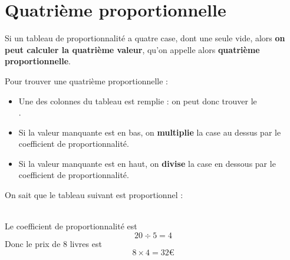 \documentclass[a4paper,11pt]{article}
\begin{document}
\section{Quatrième proportionnelle}

\begin{cours}
	Si un tableau de proportionnalité a quatre case, dont une seule vide, alors \textbf{on peut calculer la quatrième valeur}, qu'on appelle alors \textbf{quatrième proportionnelle}.
\end{cours}

\begin{methode}
	Pour trouver une quatrième proportionnelle :
	\begin{itemize}
		\item Une des colonnes du tableau est remplie : on peut donc trouver le \\ .
		\item Si la valeur manquante est en bas, on \textbf{multiplie} la case au dessus par le coefficient de proportionnalité.
		\item Si la valeur manquante est en haut, on \textbf{divise} la case en dessous par le coefficient de proportionnalité.
	\end{itemize}
\end{methode}

\begin{exemple}
	On sait que le tableau suivant est proportionnel :

	  \\
	Le coefficient de proportionnalité est
	$$ 20 ÷ 5 = 4 $$
	Donc le prix de 8 livres est
	$$ 8 × 4 = 32€ $$
\end{exemple}
\end{document}
